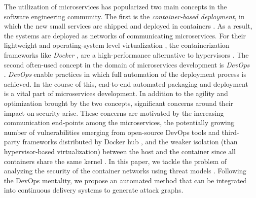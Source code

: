 The utilization of microservices has popularized two main concepts in the software engineering community. The first is the \textit{container-based deployment}, in which the new small services are shipped and deployed in containers \cite{jaramillo2016leveraging}. As a result, the systems are deployed as networks of communicating microservices. For their lightweight and operating-system level virtualization \cite{bottomely}, the containerization frameworks like \textit{Docker} \cite{cerny2018contextual}, are a high-performance  alternative to hypervisors \cite{kratzke2017microservices}. The second often-used concept in the domain of microservices development is \textit{DevOps} \cite{cerny2018contextual}. \textit{DevOps} enable practices in which full automation of the deployment process is achieved. In the course of this, end-to-end automated packaging and deployment is a vital part of microservices development. In addition to the agility and optimization brought by the two concepts, significant concerns around their impact on security \cite{ahmadvand2016requirements} arise. These concerns are motivated by the increasing communication end-points among the microservices, the potentially growing number of vulnerabilities emerging from open-source DevOps tools and third-party frameworks distributed by Docker hub \cite{shu2017study,gummaraju2015over}, and the weaker isolation (than hypervisor-based virtualization) between the host and the container since all containers share the same kernel \cite{bottomely, bui2015analysis}. In this paper, we tackle the problem of analyzing the security of the container networks using threat models \cite{kordy2014dag}. Following the DevOps mentality, we propose an automated method that can be integrated into continuous delivery systems to generate attack graphs.



